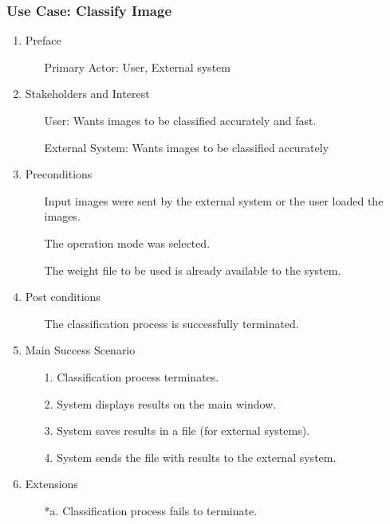 \documentclass[parskip=full]{scrartcl}
\begin{document}
\pagebreak



\subsubsection {Use Case: Classify Image} \label {uc:sip}

\begin{enumerate}
	\item Preface
	\begin{itemize} [nosep]
		\item[] Primary Actor: User, External system
	\end{itemize}
	\item Stakeholders and Interest
	\begin{itemize} [nosep]
		\item[] User: Wants images to be classified accurately and fast.
		\item[] External System: Wants images to be classified accurately
	\end{itemize}
	\item Preconditions
	\begin{itemize} [nosep]
		\item[] Input images were sent by the external system or the user loaded the images.
		\item[] The operation mode was selected.
		\item[] The weight file to be used is already available to the system.
	\end{itemize}
	\item Post conditions
	\begin{itemize} [nosep]
		\item[] The classification process is successfully terminated.
	\end{itemize}
	\item Main Success Scenario
	\begin{itemize} [nosep]
		\item[1.] Classification process terminates.
		\item[2.] System displays results on the main window.
		\item[3.] System saves results in a file (for external systems).
		\item[4.] System sends the file with results to the external system.
	\end{itemize}
	\item Extensions
	\begin{itemize} [nosep]
		\item[*a.] Classification process fails to terminate.

\end{itemize}
\end{enumerate}
\end{document}

